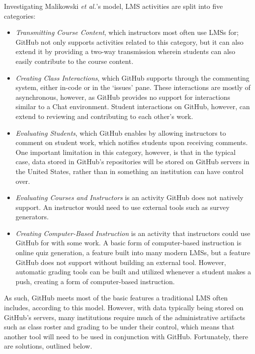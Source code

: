 Investigating Malikowski \textit{et al.}'s \cite{malikowski2007model} model, LMS activities are split into five categories:
\begin{itemize}
\item \emph{Transmitting Course Content}, which instructors most often use LMSs for; GitHub not only supports activities related to this category, but it can also extend it by providing a two-way transmission wherein students can also easily contribute to the course content.
\item \emph{Creating Class Interactions}, which GitHub supports through the commenting system, either in-code or in the `issues' pane. These interactions are mostly of asynchronous, however, as GitHub provides no support for interactions similar to a Chat environment. Student interactions on GitHub, however, can extend to reviewing and contributing to each other's work.
\item \emph{Evaluating Students}, which GitHub enables by allowing instructors to comment on student work, which notifies students upon receiving comments. One important limitation in this category, however, is that in the typical case, data stored in GitHub's repositories will be stored on GitHub servers in the United States, rather than in something an institution can have control over.
\item \emph{Evaluating Courses and Instructors} is an activity GitHub does not natively support. An instructor would need to use external tools such as survey generators.
\item \emph{Creating Computer-Based Instruction} is an activity that instructors could use GitHub for with some work. A basic form of computer-based instruction is online quiz generation, a feature built into many modern LMSs, but a feature GitHub does not support without building an external tool. However, automatic grading tools can be built and utilized whenever a student makes a push, creating a form of computer-based instruction.
\end{itemize}

As such, GitHub meets most of the basic features a traditional LMS often includes, according to this model. However, with data typically being stored on GitHub's servers, many institutions require much of the administrative artifacts such as class roster and grading to be under their control, which means that another tool will need to be used in conjunction with GitHub. Fortunately, there are solutions, outlined below.

